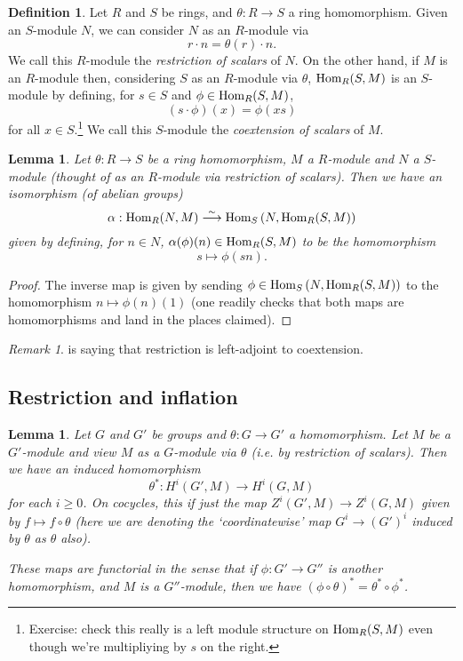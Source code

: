 \documentclass[11pt]{amsart}
\numberwithin{equation}{section}
\newtheorem{lemma}[equation]{Lemma}
\theoremstyle{remark}
\newtheorem{remark}[equation]{Remark}
\theoremstyle{remark}
\theoremstyle{remark}
\theoremstyle{definition}
\theoremstyle{definition}
\theoremstyle{definition}
\newtheorem{defi}[equation]{Definition}
\theoremstyle{definition}
\theoremstyle{definition}
\theoremstyle{definition}
\begin{document}
 \begin{defi}
 Let $R$ and $S$ be rings, and $\theta:R\rightarrow S$ a ring homomorphism. Given an $S$-module $N$, we can consider $N$ as an $R$-module via \[r\cdot n=\theta(r)\cdot n.\] We call this $R$-module the \textit{restriction of scalars} of $N$.
 On the other hand, if $M$ is an $R$-module then, considering $S$ as an $R$-module via $\theta$, $\textup{Hom}_R(S,M)$ is an $S$-module by defining, for $s\in S$ and $\phi \in \textup{Hom}_R(S,M)$, \[(s\cdot \phi)(x)=\phi(xs)\]
 for all $x\in S$.\footnote{Exercise: check this really is a left module structure on $\textup{Hom}_R(S,M)$ even though we're multipliying by $s$ on the right.} We call this $S$-module the \textit{coextension of scalars} of $M$.
 \end{defi}


\begin{lemma} \label{restriction coext adjoints}
Let $\theta:R\rightarrow S$ be a ring homomorphism, $M$ a $R$-module and $N$ a $S$-module (thought of as an $R$-module via restriction of scalars). Then we have an isomorphism (of abelian groups)
\[\alpha:\textup{Hom}_R(N,M)\stackrel{\sim}{\longrightarrow} \textup{Hom}_{S}\left(N,\textup{Hom}_R(S,M)\right)\] 
given by defining, for $n\in N$, $\alpha(\phi)(n)\in \textup{Hom}_R(S,M)$  to be the homomorphism
\[ s\mapsto \phi(sn).\]
\end{lemma}

\begin{proof}
The inverse map is given by sending  $\phi \in \textup{Hom}_{S}\left(N,\textup{Hom}_R(S,M)\right)$ to the homomorphism $n\mapsto \phi(n)(1)$ (one readily checks that both maps are homomorphisms and land in the places claimed). 
\end{proof}

\begin{remark}
 is saying that restriction is left-adjoint to coextension.
\end{remark}

\subsection{Restriction and inflation}

\begin{lemma} \label{functoriality in G}
Let $G$ and $G'$ be groups and $\theta:G\rightarrow G'$ a homomorphism. Let $M$ be a $G'$-module and view $M$ as a $G$-module via $\theta$ (i.e. by restriction of scalars). Then we have an induced homomorphism
\[\theta^*:H^i(G',M)\rightarrow H^i(G,M)\]
for each $i\geq 0$. On cocycles, this if just the map $Z^i(G',M)\rightarrow Z^i(G,M)$ given by $f\mapsto f\circ \theta$ (here we are denoting the `coordinatewise' map $G^i\rightarrow (G')^i$ induced by $\theta$ as $\theta$ also).  

These maps are functorial in the sense that if $\phi:G'\rightarrow G''$ is another homomorphism, and $M$ is a $G''$-module, then we have $(\phi \circ \theta)^*=\theta^*\circ \phi^*$. 
\end{lemma}
\end{document}
